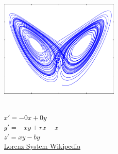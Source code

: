 \begin{example}

	\includegraphics[width=6cm, height=6cm]{images/wettermodell.png}
	


	$x'=-0x+0y$\\
	$y'=-xy+rx-x$\\
	$z'=xy-by$\\
\href{ https://en.wikipedia.org/wiki/Lorenz_system }{Lorenz System Wikipedia}


\end{example}
